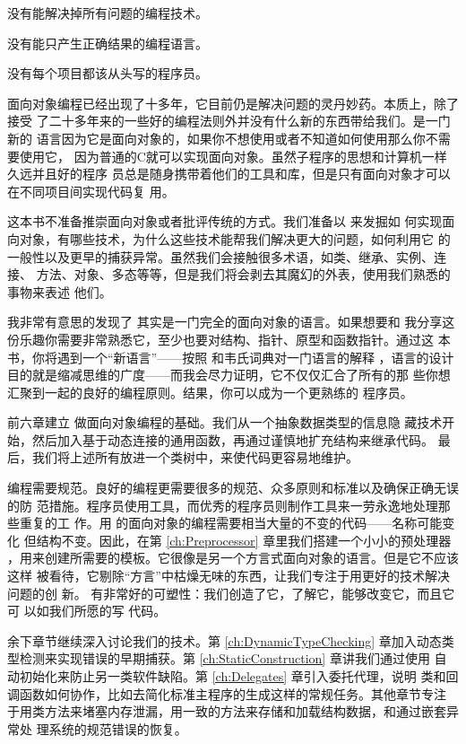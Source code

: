 \begin{flushright}
    没有能解决掉所有问题的编程技术。

    没有能只产生正确结果的编程语言。

    没有每个项目都该从头写的程序员。

\end{flushright}

面向对象编程已经出现了十多年，它目前仍是解决问题的灵丹妙药。本质上，除了接受
了二十多年来的一些好的编程法则外并没有什么新的东西带给我们。\cpp 是一门新的
语言因为它是面向对象的，如果你不想使用或者不知道如何使用那么你不需要使用它，
因为普通的C就可以实现面向对象。虽然子程序的思想和计算机一样久远并且好的程序
员总是随身携带着他们的工具和库，但是只有面向对象才可以在不同项目间实现代码复
用。

这本书不准备推崇面向对象或者批评传统的方式。我们准备以 来发掘如
何实现面向对象，有哪些技术，为什么这些技术能帮我们解决更大的问题，如何利用它
的一般性以及更早的捕获异常。虽然我们会接触很多术语，如类、继承、实例、连接、
方法、对象、多态等等，但是我们将会剥去其魔幻的外表，使用我们熟悉的事物来表述
他们。

我非常有意思的发现了 其实是一门完全的面向对象的语言。如果想要和
我分享这份乐趣你需要非常熟悉它，至少也要对结构、指针、原型和函数指针。通过这
本书，你将遇到一个“新语言”——按照 和韦氏词典对一门语言的解释
，语言的设计目的就是缩减思维的广度——而我会尽力证明，它不仅仅汇合了所有的那
些你想汇聚到一起的良好的编程原则。结果，你可以成为一个更熟练的
程序员。

前六章建立 做面向对象编程的基础。我们从一个抽象数据类型的信息隐
藏技术开始，然后加入基于动态连接的通用函数，再通过谨慎地扩充结构来继承代码。
最后，我们将上述所有放进一个类树中，来使代码更容易地维护。

编程需要规范。良好的编程更需要很多的规范、众多原则和标准以及确保正确无误的防
范措施。程序员使用工具，而优秀的程序员则制作工具来一劳永逸地处理那些重复的工
作。用 的面向对象的编程需要相当大量的不变的代码——名称可能变化
但结构不变。因此，在第 \ref{ch:Preprocessor} 章里我们搭建一个小小的预处理器
，用来创建所需要的模板。它很像是另一个方言式面向对象的语言。但是它不应该这样
被看待，它剔除“方言”中枯燥无味的东西，让我们专注于用更好的技术解决问题的创
新。 有非常好的可塑性：我们创造了它，了解它，能够改变它，而且它可
以如我们所愿的写  代码。

余下章节继续深入讨论我们的技术。第 \ref{ch:DynamicTypeChecking} 章加入动态类
型检测来实现错误的早期捕获。第 \ref{ch:StaticConstruction} 章讲我们通过使用
自动初始化来防止另一类软件缺陷。第 \ref{ch:Delegates} 章引入委托代理，说明
类和回调函数如何协作，比如去简化标准主程序的生成这样的常规任务。其他章节专注
于用类方法来堵塞内存泄漏，用一致的方法来存储和加载结构数据，和通过嵌套异常处
理系统的规范错误的恢复。

